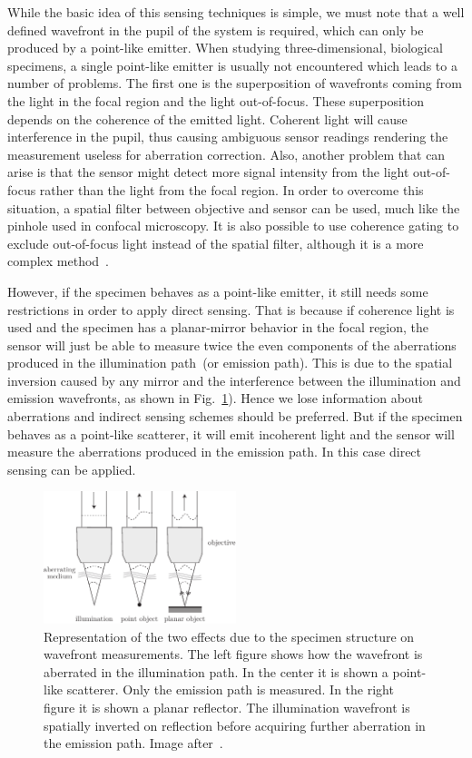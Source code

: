 While the basic idea of this sensing techniques is simple, we must note that a well defined wavefront in the pupil of the system is required, which can only be produced by a point-like emitter. When studying three-dimensional, biological specimens, a single point-like emitter is usually not encountered which leads to a number of problems. The first one is the superposition of wavefronts coming from the light in the focal region and the light out-of-focus. These superposition depends on the coherence of the emitted light. Coherent light will cause interference in the pupil, thus causing ambiguous sensor readings rendering the measurement useless for aberration correction. Also, another problem that can arise is that the sensor might detect more signal intensity from the light out-of-focus rather than the light from the focal region. In order to overcome this situation, a spatial filter between objective and sensor can be used, much like the pinhole used in confocal microscopy. It is also possible to use coherence gating to exclude out-of-focus light instead of the spatial filter, although it is a more complex method~\cite{scan_TPFM_gated_wavefront}. 

However, if the specimen behaves as a point-like emitter, it still needs some restrictions in order to apply direct sensing. That is because if coherence light is used and the specimen has a planar-mirror behavior in the focal region, the sensor will just be able to measure twice the even components of the aberrations produced in the illumination path~(or emission path). This is due to the spatial inversion caused by any mirror and the interference between the illumination and emission wavefronts, as shown in Fig.~\ref{fig:abe_direct_sensing}). Hence we lose information about aberrations and indirect sensing schemes should be preferred. But if the specimen behaves as a point-like scatterer, it will emit incoherent light and the sensor will measure the aberrations produced in the emission path. In this case direct sensing can be applied.  

\begin{figure}[htbp]
	\centering
		\includegraphics[width=0.50\textwidth]{images/abe_direct_sensing}
	\caption{Representation of the two effects due to the specimen structure on wavefront measurements. The left figure shows how the wavefront is aberrated in the illumination path. In the center it is shown a point-like scatterer. Only the emission path is measured. In the right figure it is shown a planar reflector. The illumination wavefront is spatially inverted on reflection before acquiring further aberration in the emission path. Image after~\cite{AOM_basic_ref}.}
	\label{fig:abe_direct_sensing}
\end{figure}

